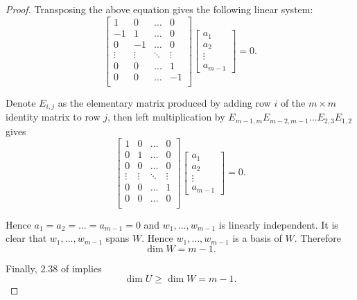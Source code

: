 \begin{proof}
Transposing the above equation gives the following linear system:\[
\begin{bmatrix}
1 & 0 & \dots & 0\\
-1 & 1 & \dots & 0\\
0 & -1 & \dots & 0\\
\vdots&\vdots&\ddots&\vdots\\
0 & 0 & \dots & 1\\
0 & 0 & \dots & -1\\
\end{bmatrix}
\begin{bmatrix}
a_1\\
a_2\\
\vdots\\
a_{m-1}
\end{bmatrix}
=0.
\]

Denote $E_{i,j}$ as the elementary matrix produced by adding row $i$ of the $m\times m$ identity matrix to row $j$, then left multiplication by $E_{m-1,m}E_{m-2,m-1}\dots E_{2,3}E_{1,2}$ gives\[
\begin{bmatrix}
1 & 0 & \dots & 0\\
0 & 1 & \dots & 0\\
0 & 0 & \dots & 0\\
\vdots&\vdots&\ddots&\vdots\\
0 & 0 & \dots & 1\\
0 & 0 & \dots & 0\\
\end{bmatrix}
\begin{bmatrix}
a_1\\
a_2\\
\vdots\\
a_{m-1}
\end{bmatrix}
=0.
\]

Hence $a_1=a_2=\dots=a_{m-1}=0$ and $w_1,\dots,w_{m-1}$ is linearly independent. It is clear that $w_1,\dots,w_{m-1}$ spans $W$. Hence $w_1,\dots,w_{m-1}$ is a basis of $W$. Therefore\[
\dim W=m-1.
\]

Finally, 2.38 of \cite{axler2014linear} implies\[
\dim U\geqslant\dim W=m-1.
\]
\end{proof}
